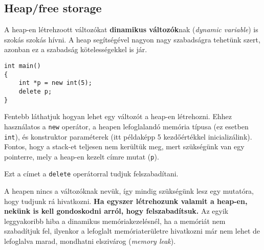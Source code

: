 \documentclass[a4paper,11.5pt]{article}
\begin{document}
	\subsection{Heap/free storage}
	A heap-en létrehzoott változókat \textbf{dinamikus változók}nak (\textit{dynamic variable}) is szokás szokás hívni. A heap segítségével nagyon nagy szabadságra tehetünk szert, azonban ez a szabadság kötelességekkel is jár.
	\begin{lstlisting}
int main()
{
	int *p = new int(5);
	delete p;
}
	\end{lstlisting}
	Fentebb láthatjuk hogyan lehet egy változót a heap-en létrehozni. Ehhez használatos a \texttt{new} operátor, a heapen lefoglalandó memória típusa (ez esetben \texttt{int}), és konstruktor paraméterek (itt példaképp 5 kezdőértékkel inicializálink). Fontos, hogy a stack-et teljesen nem kerültük meg, mert szükségünk van egy pointerre, mely a heap-en kezelt címre mutat (\texttt{p}).
	
	Ezt a címet a \texttt{delete} operátorral tudjuk felszabadítani.
	\begin{center}
	\end{center}
	
	A heapen nincs a változóknak nevük, így mindig szükségünk lesz egy mutatóra, hogy tudjunk rá hivatkozni. \textbf{Ha egyszer létrehozunk valamit a heap-en, nekünk is kell gondoskodni arról, hogy felszabadítsuk.} Az egyik leggyakoribb hiba a dinamikus memóriakezelésnél, ha a memóriát nem szabadítjuk fel, ilyenkor a lefoglalt memóriaterületre hivatkozni már nem lehet de lefoglalva marad, mondhatni elszivárog (\textit{memory leak}). 
	\smallskip
	
\end{document}
